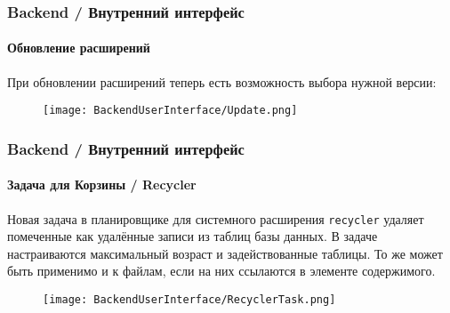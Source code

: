 \begin{frame}[fragile]
	\frametitle{Backend / Внутренний интерфейс}
	\framesubtitle{Обновление расширений}

	При обновлении расширений теперь есть возможность выбора нужной версии:

	\begin{figure}
		\texttt{[image: BackendUserInterface/Update.png]}
	\end{figure}

\end{frame}

\begin{frame}[fragile]
	\frametitle{Backend / Внутренний интерфейс}
	\framesubtitle{Задача для Корзины / Recycler}

	Новая задача в планировщике для системного расширения \texttt{recycler} удаляет
	помеченные как удалённые записи из таблиц базы данных. В задаче настраиваются
	максимальный возраст и задействованные таблицы.
	\newline
	То же может быть применимо и к файлам, если на них ссылаются в элементе содержимого.

	\begin{figure}
		\texttt{[image: BackendUserInterface/RecyclerTask.png]}
	\end{figure}

\end{frame}

